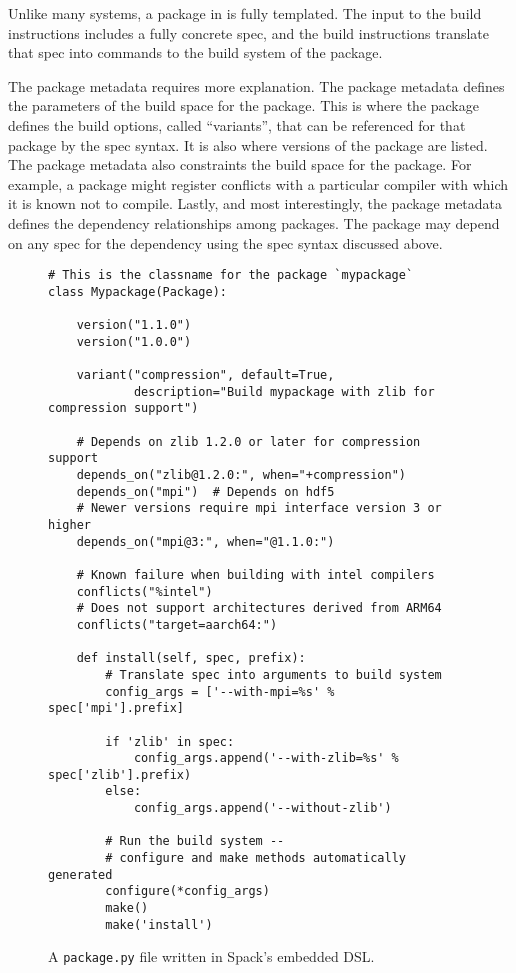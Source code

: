 Unlike many systems, a package in \spack{} is fully templated. The input to the build instructions includes a fully concrete spec, and the build instructions translate that spec into commands to the build system of the package.

The package metadata requires more explanation. The package metadata defines the parameters of the build space for the package. This is where the package defines the build options, called ``variants'', that can be referenced for that package by the spec syntax. It is also where versions of the package are listed. The package metadata also constraints the build space for the package. For example, a package might register conflicts with a particular compiler with which it is known not to compile. Lastly, and most interestingly, the package metadata defines the dependency relationships among packages. The package may depend on any spec for the dependency using the spec syntax discussed above.

\begin{figure}
\begin{verbatim}
# This is the classname for the package `mypackage`
class Mypackage(Package):

    version("1.1.0")
    version("1.0.0")

    variant("compression", default=True,
            description="Build mypackage with zlib for compression support")

    # Depends on zlib 1.2.0 or later for compression support
    depends_on("zlib@1.2.0:", when="+compression")
    depends_on("mpi")  # Depends on hdf5
    # Newer versions require mpi interface version 3 or higher
    depends_on("mpi@3:", when="@1.1.0:")

    # Known failure when building with intel compilers
    conflicts("%intel")
    # Does not support architectures derived from ARM64
    conflicts("target=aarch64:")

    def install(self, spec, prefix):
        # Translate spec into arguments to build system
        config_args = ['--with-mpi=%s' % spec['mpi'].prefix]

        if 'zlib' in spec:
            config_args.append('--with-zlib=%s' % spec['zlib'].prefix)
        else:
            config_args.append('--without-zlib')

        # Run the build system --
        # configure and make methods automatically generated
        configure(*config_args)
        make()
        make('install')
\end{verbatim}
\caption{
  A {\tt package.py} file written in Spack's embedded DSL.
  \label{fig:example-spack-package}
}
\end{figure}

